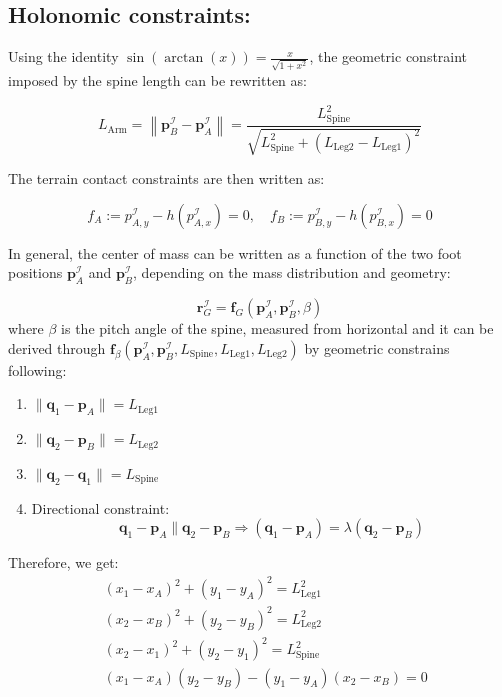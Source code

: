 \documentclass[11pt]{article}
\begin{document}
\subsection{Holonomic constraints:}

Using the identity \( \sin(\arctan(x)) = \frac{x}{\sqrt{1 + x^2}} \), the geometric constraint imposed by the spine length can be rewritten as:

\[
L_\text{Arm} = \left\| \mathbf{p}_B^\mathcal{I} - \mathbf{p}_A^\mathcal{I} \right\| =
\frac{L_\text{Spine}^2}{\sqrt{L_\text{Spine}^2 + \left(L_{\text{Leg}2} - L_{\text{Leg}1}\right)^2}}
\]

The terrain contact constraints are then written as:

\[
f_A := p_{A,y}^\mathcal{I} - h(p_{A,x}^\mathcal{I}) = 0, \quad
f_B := p_{B,y}^\mathcal{I} - h(p_{B,x}^\mathcal{I}) = 0
\]

In general, the center of mass can be written as a function of the two foot positions \( \mathbf{p}_A^\mathcal{I} \) and \( \mathbf{p}_B^\mathcal{I} \), depending on the mass distribution and geometry:

\[
\mathbf{r}_G^\mathcal{I} = \mathbf{f}_G\left( \mathbf{p}_A^\mathcal{I}, \mathbf{p}_B^\mathcal{I} , \beta \right)
\]
where \( \beta \) is the pitch angle of the spine, measured from horizontal and it can be derived through
\(\mathbf{f}_{\beta}(\mathbf{p}_A^\mathcal{I},\mathbf{p}_B^\mathcal{I},L_\text{Spine},L_{\text{Leg}1},L_{\text{Leg}2})\) 
by geometric constrains following:
\begin{enumerate}
    \item $\|\mathbf{q}_1 - \mathbf{p}_A\| = L_\text{Leg1}$
    \item $\|\mathbf{q}_2 - \mathbf{p}_B\| = L_\text{Leg2}$
    \item $\|\mathbf{q}_2 - \mathbf{q}_1\| = L_\text{Spine}$
    \item Directional constraint: 
    \[
        \mathbf{q}_1 - \mathbf{p}_A \parallel \mathbf{q}_2 - \mathbf{p}_B 
        \Rightarrow 
        (\mathbf{q}_1 - \mathbf{p}_A) = \lambda (\mathbf{q}_2 - \mathbf{p}_B)
    \]
\end{enumerate}
Therefore, we get:
\begin{align*}
& (x_1 - x_A)^2 + (y_1 - y_A)^2 = L_{\text{Leg}1}^2 \\[0.5em]
& (x_2 - x_B)^2 + (y_2 - y_B)^2 = L_{\text{Leg}2}^2 \\[0.5em]
& (x_2 - x_1)^2 + (y_2 - y_1)^2 = L_{\text{Spine}}^2 \\[0.5em]
& (x_1 - x_A)(y_2 - y_B) - (y_1 - y_A)(x_2 - x_B) = 0
\end{align*}
\end{document}
